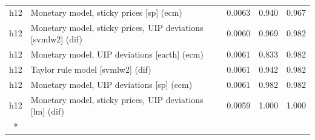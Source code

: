 \begin{ThreePartTable}
\begin{longtable}[t]{cp{5.5cm}ccc}
h12 & \raggedright Monetary model, sticky prices [sp] (ecm) & 0.0063 & 0.940 & 0.967\\
h12 & \raggedright Monetary model, sticky prices, UIP deviations [svmlw2] (dif) & 0.0060 & 0.969 & 0.982\\
h12 & \raggedright Monetary model, UIP deviations [earth] (ecm) & 0.0061 & 0.833 & 0.982\\
h12 & \raggedright Taylor rule model [svmlw2] (dif) & 0.0061 & 0.942 & 0.982\\
h12 & \raggedright Monetary model, UIP deviations [sp] (ecm) & 0.0061 & 0.982 & 0.982\\
h12 & \raggedright Monetary model, sticky prices, UIP deviations [lm] (dif) & 0.0059 & 1.000 & 1.000\\*
\end{longtable}
\end{ThreePartTable}
\endgroup{}
